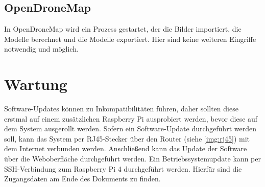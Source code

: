 \documentclass[./00PhotoBox.tex]{subfiles}
\begin{document}
\subsection{OpenDroneMap}
In OpenDroneMap wird ein Prozess gestartet, der die Bilder importiert, die Modelle berechnet und die Modelle exportiert. Hier sind keine weiteren Eingriffe notwendig und möglich.


\section{Wartung}
Software-Updates können zu Inkompatibilitäten führen, daher sollten diese erstmal auf einem zusätzlichen Raspberry Pi ausprobiert werden, bevor diese auf dem System ausgerollt werden. Sofern ein Software-Update durchgeführt werden soll, kann das System per RJ45-Stecker über den Router (siehe \autoref{img:rj45}) mit dem Internet verbunden werden. Anschließend kann das Update der Software über die Weboberfläche durchgeführt werden. Ein Betriebssystemupdate kann per SSH-Verbindung zum Raspberry Pi 4 durchgeführt werden. Hierfür sind die Zugangsdaten am Ende des Dokuments zu finden.
\end{document}
